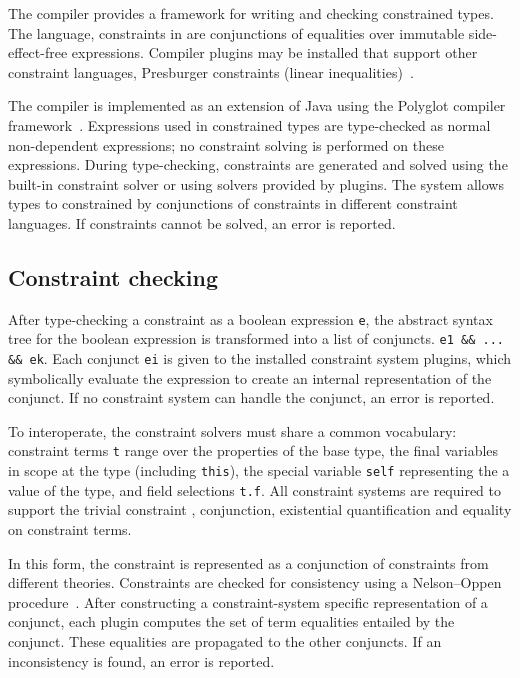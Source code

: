 %

The \Xten{} compiler provides a framework for writing and
checking constrained types.  The \Xten{} 
language, 
constraints in \Xten{} are conjunctions of equalities over immutable
side-effect-free expressions.  Compiler plugins may be installed
that support other constraint languages, Presburger
constraints (linear inequalities)~\cite{??}.

The \Xten{} compiler is implemented as an extension of
Java using the Polyglot compiler framework~\cite{ncm03}.
Expressions used in constrained
types are type-checked as normal non-dependent \Xten{} expressions;
no constraint solving is performed on these expressions.
During type-checking, constraints are generated and solved using
the built-in constraint solver or using solvers provided by
plugins.  The system allows types to constrained by conjunctions
of constraints in different constraint languages.
If constraints cannot be solved, an error is reported.

\subsection{Constraint checking}

After type-checking a constraint as a boolean expression {\tt e},
the abstract syntax tree for
the boolean expression is transformed into a list of conjuncts.
{\tt e1 \&\& ... \&\& ek}.  Each conjunct {\tt ei} is given to 
the installed constraint system plugins, which symbolically
evaluate the expression to create an internal representation of
the conjunct.  If no
constraint system can handle the conjunct, an error is reported.

To interoperate, the constraint solvers must share a common
vocabulary: constraint terms {\tt t} range over the properties of the
base type, the final variables in scope at the type (including
{\tt this}), the special variable {\tt self} representing
the a value of the type, and field selections {\tt t.f}.
All
constraint systems are required to support the trivial
constraint
\true, conjunction, existential quantification and equality on
constraint terms.


In this form, the constraint is represented as a 
conjunction of constraints from different theories.  Constraints
are checked for consistency using a Nelson--Oppen
procedure~\cite{nelson-oppen}.
After constructing a constraint-system specific 
representation of a conjunct, each plugin computes the set of
term equalities entailed by the conjunct.  These equalities are
propagated to the other conjuncts.  If an inconsistency is
found, an error is reported. 

